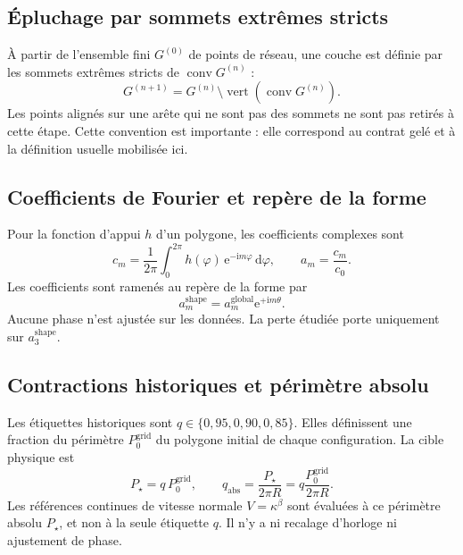 \documentclass[11pt,a4paper]{article}
\newcommand{\ii}{\mathrm{i}}
\newcommand{\e}{\mathrm{e}}
\begin{document}
\subsection{Épluchage par sommets extrêmes stricts}

À partir de l'ensemble fini $G^{(0)}$ de points de réseau, une couche est définie par les sommets extrêmes stricts de $\operatorname{conv}G^{(n)}$ :
\begin{equation}
  G^{(n+1)}=G^{(n)}\setminus
  \operatorname{vert}\!\left(\operatorname{conv}G^{(n)}\right).
\end{equation}
Les points alignés sur une arête qui ne sont pas des sommets ne sont pas retirés à cette étape. Cette convention est importante : elle correspond au contrat gelé et à la définition usuelle mobilisée ici.

\subsection{Coefficients de Fourier et repère de la forme}

Pour la fonction d'appui $h$ d'un polygone, les coefficients complexes sont
\begin{equation}
  c_m=\frac{1}{2\pi}\int_0^{2\pi}
  h(\varphi)\,\e^{-\ii m\varphi}\,\mathrm d\varphi,
  \qquad a_m=\frac{c_m}{c_0}.
\end{equation}
Les coefficients sont ramenés au repère de la forme par
\begin{equation}
  a_m^{\mathrm{shape}}=a_m^{\mathrm{global}}\e^{+\ii m\theta}.
\end{equation}
Aucune phase n'est ajustée sur les données. La perte étudiée porte uniquement sur $a_3^{\mathrm{shape}}$.

\subsection{Contractions historiques et périmètre absolu}

Les étiquettes historiques sont $q\in\{0{,}95,0{,}90,0{,}85\}$. Elles définissent une fraction du périmètre $P_0^{\mathrm{grid}}$ du polygone initial de chaque configuration. La cible physique est
\begin{equation}
  P_\star=q\,P_0^{\mathrm{grid}},
  \qquad
  q_{\mathrm{abs}}=\frac{P_\star}{2\pi R}
  =q\frac{P_0^{\mathrm{grid}}}{2\pi R}.
\end{equation}
Les références continues de vitesse normale $V=\kappa^\beta$ sont évaluées à ce périmètre absolu $P_\star$, et non à la seule étiquette $q$. Il n'y a ni recalage d'horloge ni ajustement de phase.
\end{document}
